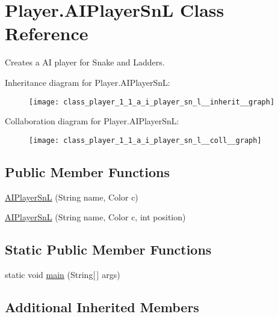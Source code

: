 \hypertarget{class_player_1_1_a_i_player_sn_l}{}\section{Player.\+A\+I\+Player\+Sn\+L Class Reference}
\label{class_player_1_1_a_i_player_sn_l}


Creates a A\+I player for Snake and Ladders.  




Inheritance diagram for Player.\+A\+I\+Player\+Sn\+L\+:\nopagebreak
\begin{figure}[H]
\begin{center}
\leavevmode
\texttt{[image: class\_player\_1\_1\_a\_i\_player\_sn\_l\_\_inherit\_\_graph]}
\end{center}
\end{figure}


Collaboration diagram for Player.\+A\+I\+Player\+Sn\+L\+:\nopagebreak
\begin{figure}[H]
\begin{center}
\leavevmode
\texttt{[image: class\_player\_1\_1\_a\_i\_player\_sn\_l\_\_coll\_\_graph]}
\end{center}
\end{figure}
\subsection*{Public Member Functions}
\begin{DoxyCompactItemize}
\item 
\hyperlink{class_player_1_1_a_i_player_sn_l_a6925c3a7d1b9ec60814a81770d013909}{A\+I\+Player\+Sn\+L} (String name, Color c)
\item 
\hyperlink{class_player_1_1_a_i_player_sn_l_af70de8501407cb1a81c609a571155d35}{A\+I\+Player\+Sn\+L} (String name, Color c, int position)
\end{DoxyCompactItemize}
\subsection*{Static Public Member Functions}
\begin{DoxyCompactItemize}
\item 
static void \hyperlink{class_player_1_1_a_i_player_sn_l_addf8c57621626f61e1415d2b945b5eff}{main} (String\mbox{[}$\,$\mbox{]} args)
\end{DoxyCompactItemize}
\subsection*{Additional Inherited Members}


